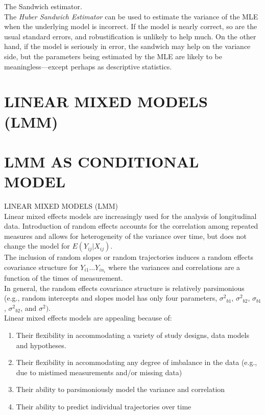\documentclass[letterpaper,11pt]{article}
\begin{document}
The Sandwich estimator.\\
The \textit{Huber Sandwich Estimator} can be used to estimate the variance of the MLE when the underlying model is incorrect.  
If the model is nearly correct, so are the usual standard errors, and robustification is unlikely to help much.  
On the other hand, if the model is seriously in error, the sandwich may help on the variance side, but the parameters
being estimated by the MLE are likely to be meaningless—except perhaps as descriptive statistics.


\newpage
\noindent 

\section*{LINEAR MIXED MODELS (LMM)}

\section{LMM AS CONDITIONAL MODEL}

LINEAR MIXED MODELS (LMM)\\

Linear mixed effects models are increasingly used for the analysis of longitudinal data.
Introduction of random effects accounts for the correlation among repeated measures and allows for heterogeneity of the variance over time, but does not change the model for $E(Y_{ij} | X_{ij})$.\\

The inclusion of random slopes or random trajectories induces a random effects covariance structure for 
$Y_{i1} \ldots Y_{in}_{i}$ where the variances and correlations are a function of the times of measurement.\\

In general, the random effects covariance structure is relatively parsimonious (e.g., random intercepts and slopes model has only four
parameters, $\sigma{^2}_{b1}$, $\sigma{^2}_{b2}$, $\sigma_{b1}$, $\sigma{^2}_{b2}$, and $\sigma{^2})$.\\


Linear mixed effects models are appealing because of:\\

\begin{enumerate}

\item Their flexibility in accommodating a variety of study designs, data models and hypotheses.
\item Their flexibility in accommodating any degree of imbalance in the data (e.g., due to mistimed measurements and/or missing data)
\item Their ability to parsimoniously model the variance and correlation
\item Their ability to predict individual trajectories over time

\end{enumerate}
\end{document}
